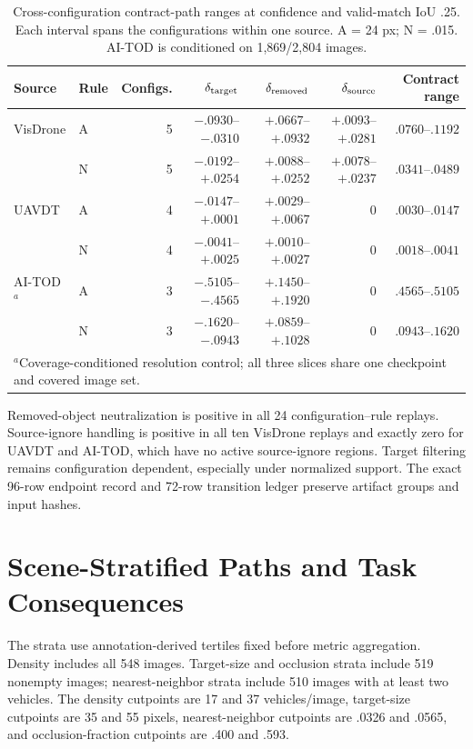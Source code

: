 \documentclass[journal]{IEEEtran}
\begin{document}
\begin{table}[!t]
\centering
\caption{Cross-configuration contract-path ranges at confidence and valid-match IoU .25. Each interval spans the configurations within one source. A = 24 px; N = .015. AI-TOD is conditioned on 1,869/2,804 images.}\label{tab:cross-config}
\tiny
\setlength{\tabcolsep}{3.0pt}\renewcommand{\arraystretch}{.96}
\begin{tabular}{llrrrrr}
\toprule
Source & Rule & Configs. & $\delta_{\rm target}$ & $\delta_{\rm removed}$ & $\delta_{\rm source}$ & Contract range\\
\midrule
VisDrone & A & 5 & $-.0930$--$-.0310$ & $+.0667$--$+.0932$ & $+.0093$--$+.0281$ & $.0760$--$.1192$\\
         & N & 5 & $-.0192$--$+.0254$ & $+.0088$--$+.0252$ & $+.0078$--$+.0237$ & $.0341$--$.0489$\\
UAVDT    & A & 4 & $-.0147$--$+.0001$ & $+.0029$--$+.0067$ & $0$ & $.0030$--$.0147$\\
         & N & 4 & $-.0041$--$+.0025$ & $+.0010$--$+.0027$ & $0$ & $.0018$--$.0041$\\
AI-TOD$^a$ & A & 3 & $-.5105$--$-.4565$ & $+.1450$--$+.1920$ & $0$ & $.4565$--$.5105$\\
           & N & 3 & $-.1620$--$-.0943$ & $+.0859$--$+.1028$ & $0$ & $.0943$--$.1620$\\
\bottomrule
\multicolumn{7}{l}{\scriptsize $^a$Coverage-conditioned resolution control; all three slices share one checkpoint and covered image set.}
\end{tabular}
\end{table}

Removed-object neutralization is positive in all 24 configuration--rule replays. Source-ignore handling is positive in all ten VisDrone replays and exactly zero for UAVDT and AI-TOD, which have no active source-ignore regions. Target filtering remains configuration dependent, especially under normalized support. The exact 96-row endpoint record and 72-row transition ledger preserve artifact groups and input hashes.

\section{Scene-Stratified Paths and Task Consequences}
The strata use annotation-derived tertiles fixed before metric aggregation. Density includes all 548 images. Target-size and occlusion strata include 519 nonempty images; nearest-neighbor strata include 510 images with at least two vehicles. The density cutpoints are 17 and 37 vehicles/image, target-size cutpoints are 35 and 55 pixels, nearest-neighbor cutpoints are .0326 and .0565, and occlusion-fraction cutpoints are .400 and .593.
\end{document}
